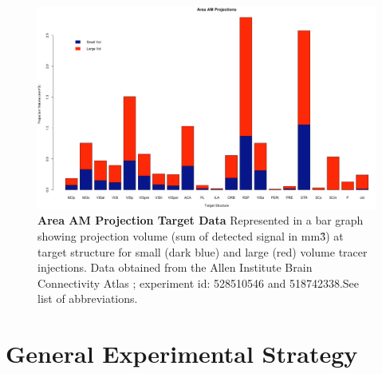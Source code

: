 \begin{figure}
  \centering
   \includegraphics[width=\textwidth]{Figures/chapter4/areaAMprojectiondata2.png}
  \caption[Area AM Projection Target Data]{\textbf{Area AM Projection Target Data} Represented in a bar graph showing projection volume (sum of detected signal in mm\^3) at target structure for small (dark blue) and large (red) volume tracer injections. Data obtained from the Allen Institute Brain Connectivity Atlas \parencite{AllenBrain2015}; experiment id: 528510546 and 518742338.See list of abbreviations.}
   \label{fig:areaAMprojections}
\end{figure}

\section{General Experimental Strategy}
